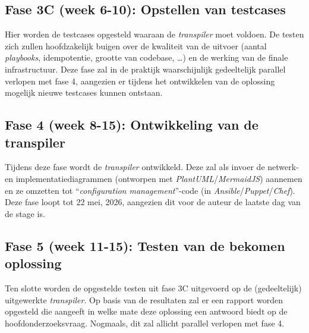\subsection{Fase 3C (week 6-10): Opstellen van testcases}%
\label{subsec:voorstel_opstellen_testcases}

Hier worden de testcases opgesteld waaraan de \emph{transpiler} moet voldoen. De testen zich zullen hoofdzakelijk buigen over de kwaliteit van de uitvoer (aantal \emph{playbooks}, idempotentie, grootte van codebase, \ldots) en de werking van de finale infrastructuur. Deze fase zal in de praktijk waarschijnlijk gedeeltelijk parallel verlopen met fase 4, aangezien er tijdens het ontwikkelen van de oplossing mogelijk nieuwe testcases kunnen ontstaan.

\subsection{Fase 4 (week 8-15): Ontwikkeling van de transpiler}%
\label{subsec:voorstel_ontwikkeling_poc_transpiler}

Tijdens deze fase wordt de \emph{transpiler} ontwikkeld. Deze zal als invoer de netwerk- en implementatiediagrammen (ontworpen met \emph{PlantUML}/\emph{MermaidJS}) aannemen en ze omzetten tot ``\emph{configuration management}''-code (in \emph{Ansible}/\emph{Puppet}/\emph{Chef}). Deze fase loopt tot 22 mei, 2026, aangezien dit voor de auteur de laatste dag van de stage is.

\subsection{Fase 5 (week 11-15): Testen van de bekomen oplossing}%
\label{subsec:voorstel_evaluatie_bekomen_oplossing}

Ten slotte worden de opgestelde testen uit fase 3C uitgevoerd op de (gedeeltelijk) uitgewerkte \emph{transpiler}. Op basis van de resultaten zal er een rapport worden opgesteld die aangeeft in welke mate deze oplossing een antwoord biedt op de hoofdonderzoeksvraag. Nogmaals, dit zal allicht parallel verlopen met fase 4.



